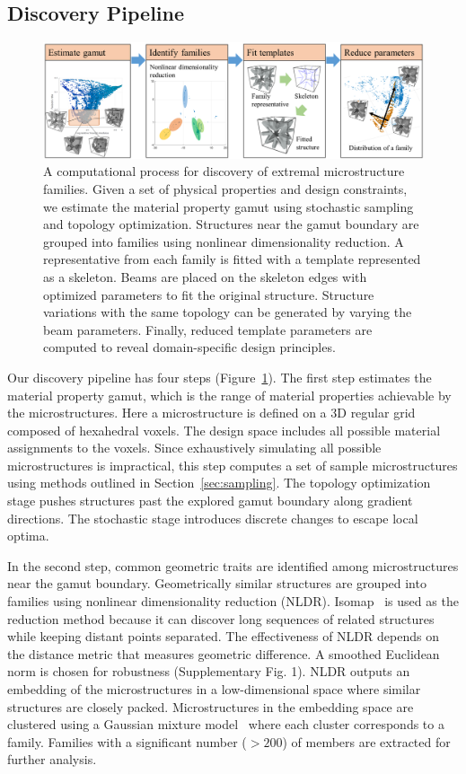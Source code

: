 \subsection{Discovery Pipeline}
\begin{figure}
	\includegraphics[width=\textwidth]{images/discoveryPipeline.png}
	\caption{A computational process for discovery of extremal microstructure families. Given a set of physical properties and design constraints, we estimate the material property gamut using stochastic sampling and topology optimization. Structures near the gamut boundary are grouped into families using nonlinear dimensionality reduction. A representative from each family is fitted with a template represented as a skeleton. Beams are placed on the skeleton edges with optimized parameters to fit the original structure. Structure variations with the same topology can be generated by varying the beam parameters. Finally, reduced template parameters are computed to reveal domain-specific design principles. }
	\label{fig:discovery}
\end{figure}
Our discovery pipeline has four steps (Figure~\ref{fig:discovery}). The first step estimates the material property gamut, which is the range of material properties achievable by the microstructures. Here a microstructure is defined on a 3D regular grid composed of hexahedral voxels. The design space includes all possible material assignments to the voxels.
Since exhaustively simulating all possible microstructures is impractical, this step computes a set of sample microstructures using methods outlined in Section~\ref{sec:sampling}.
The topology optimization stage pushes structures past the explored gamut boundary along gradient directions. The stochastic stage introduces discrete changes to escape local optima.

In the second step, common geometric traits are identified among microstructures near the gamut boundary. Geometrically similar structures are grouped into families using nonlinear dimensionality reduction (NLDR). Isomap~\citep{tenenbaum2000global} is used as the reduction method because it can discover long sequences of related structures while keeping distant points separated. The effectiveness of NLDR depends on the distance metric that measures geometric difference. A smoothed Euclidean norm is chosen for robustness (Supplementary Fig. 1). NLDR outputs an embedding of the microstructures in a low-dimensional space where similar structures are closely packed.
Microstructures in the embedding space are clustered using a Gaussian mixture model~\citep{mclachlan2007algorithm} where each cluster corresponds to a family. Families with a significant number ($>200$) of members are extracted for further analysis.

